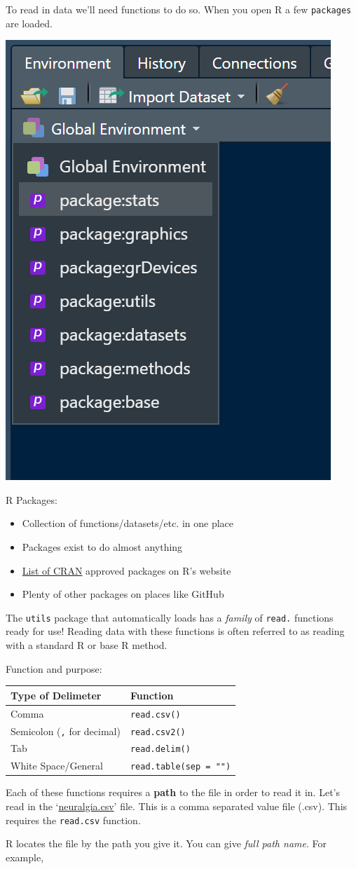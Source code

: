 \documentclass[
]{book}
\theoremstyle{definition}
\theoremstyle{definition}
\theoremstyle{definition}
\theoremstyle{remark}
\begin{document}
To read in data we'll need functions to do so. When you open R a few \texttt{packages} are loaded.

\begin{center}\includegraphics[width=0.2\linewidth]{img/loadR} \end{center}

R Packages:

\begin{itemize}
\item
  Collection of functions/datasets/etc. in one place
\item
  Packages exist to do almost anything
\item
  \href{https://cran.r-project.org/web/packages/available_packages_by_name.html}{List of CRAN} approved packages on R's website
\item
  Plenty of other packages on places like GitHub
\end{itemize}

The \texttt{utils} package that automatically loads has a \emph{family} of \texttt{read.} functions ready for use! Reading data with these functions is often referred to as reading with a standard R or base R method.

Function and purpose:

\begin{longtable}[]{@{}ll@{}}
\toprule
Type of Delimeter & Function\tabularnewline
\midrule
\endhead
Comma & \texttt{read.csv()}\tabularnewline
Semicolon (\texttt{,} for decimal) & \texttt{read.csv2()}\tabularnewline
Tab & \texttt{read.delim()}\tabularnewline
White Space/General & \texttt{read.table(sep\ =\ "")}\tabularnewline
\bottomrule
\end{longtable}

Each of these functions requires a \textbf{path} to the file in order to read it in. Let's read in the `\href{https://www4.stat.ncsu.edu/~online/datasets/neuralgia.csv}{neuralgia.csv}' file. This is a comma separated value file (.csv). This requires the \texttt{read.csv} function.

R locates the file by the path you give it. You can give \emph{full path name}. For example,
\end{document}
